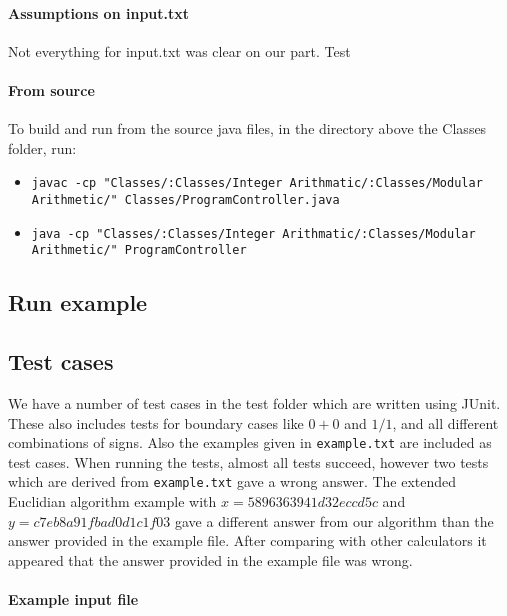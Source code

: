 \documentclass[a4paper]{article}
\begin{document}
\paragraph{Assumptions on input.txt}

Not everything for input.txt was clear on our part.
Test



\paragraph{From source}

To build and run from the source java files, in the directory above the Classes folder, run:

\begin{itemize}
\item \texttt{javac -cp "Classes/:Classes/Integer Arithmatic/:Classes/Modular Arithmetic/" Classes/ProgramController.java}
\item \texttt{java -cp "Classes/:Classes/Integer Arithmatic/:Classes/Modular Arithmetic/" ProgramController}
\end{itemize}



\subsection{Run example}


\subsection{Test cases}

We have a number of test cases in the test folder which are written using JUnit.
These also includes tests for boundary cases like $0+0$ and $1/1$, and all different combinations of signs.
Also the examples given in \texttt{example.txt} are included as test cases.
When running the tests, almost all tests succeed, however two tests which are derived from \texttt{example.txt} gave a wrong answer.
The extended Euclidian algorithm example with $x=5896363941d32eccd5c$ and $y=c7eb8a91fbad0d1c1f03$ gave a different answer from our algorithm than
the answer provided in the example file.
After comparing with other calculators it appeared that the answer provided in the example file was wrong.


\paragraph{Example input file}
\end{document}
